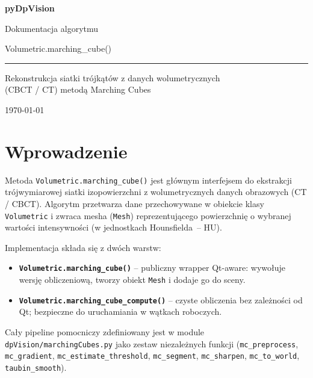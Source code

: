 \documentclass[12pt,a4paper]{article}
\begin{document}
\begin{titlepage}
  \centering
  \vspace*{3cm}
  {\LARGE\bfseries pyDpVision \par}
  \vspace{0.5cm}
  {\large Dokumentacja algorytmu \par}
  \vspace{0.3cm}
  {\huge\ttfamily Volumetric.marching\_cube() \par}
  \vspace{1cm}
  \rule{0.6\textwidth}{0.4pt}
  \vspace{0.5cm}
  \par
  {\large Rekonstrukcja siatki trójkątów z danych wolumetrycznych\\ (CBCT / CT) metodą Marching Cubes \par}
  \vfill
  {\small \today}
\end{titlepage}

\tableofcontents
\newpage

\section{Wprowadzenie}

Metoda \texttt{Volumetric.marching\_cube()} jest głównym interfejsem do ekstrakcji
trójwymiarowej siatki izopowierzchni z wolumetrycznych danych obrazowych (CT / CBCT).
Algorytm przetwarza dane przechowywane w obiekcie klasy \texttt{Volumetric} i
zwraca mesha (\texttt{Mesh}) reprezentującego powierzchnię o wybranej wartości
intensywności (w jednostkach Hounsfielda~-- HU).

Implementacja składa się z dwóch warstw:
\begin{itemize}
  \item \textbf{\texttt{Volumetric.marching\_cube()}} -- publiczny wrapper Qt-aware:
    wywołuje wersję obliczeniową, tworzy obiekt \texttt{Mesh} i dodaje go do sceny.
  \item \textbf{\texttt{Volumetric.marching\_cube\_compute()}} -- czyste obliczenia
    bez zależności od Qt; bezpieczne do uruchamiania w wątkach roboczych.
\end{itemize}

Cały pipeline pomocniczy zdefiniowany jest w module
\texttt{dpVision/marchingCubes.py} jako zestaw niezależnych funkcji
(\texttt{mc\_preprocess}, \texttt{mc\_gradient}, \texttt{mc\_estimate\_threshold},
\texttt{mc\_segment}, \texttt{mc\_sharpen}, \texttt{mc\_to\_world},
\texttt{taubin\_smooth}).
\end{document}
